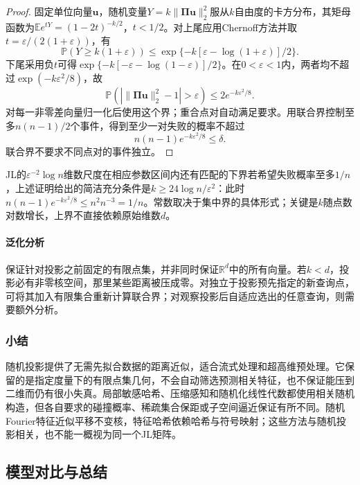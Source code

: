 \begin{proof}
固定单位向量$\bm{u}$，随机变量$Y=k\lVert\bm{\Pi}\bm{u}\rVert_2^2$服从$k$自由度的卡方分布，其矩母函数为$\mathbb{E}e^{tY}=(1-2t)^{-k/2}$，$t<1/2$。对上尾应用Chernoff方法并取$t=\varepsilon/(2(1+\varepsilon))$，有
\[
  \mathbb{P}(Y\geq k(1+\varepsilon))
  \leq\exp\{-k[\varepsilon-\log(1+\varepsilon)]/2\}.
\]
下尾采用负$t$可得$\exp\{-k[-\varepsilon-\log(1-\varepsilon)]/2\}$。在$0<\varepsilon<1$内，两者均不超过$\exp(-k\varepsilon^2/8)$，故
\[
  \mathbb{P}\left(
   \left|\lVert\bm{\Pi}\bm{u}\rVert_2^2-1\right|>\varepsilon
   \right)\leq2e^{-k\varepsilon^2/8}.
\]
对每一非零差向量归一化后使用这个界；重合点对自动满足要求。用联合界控制至多$n(n-1)/2$个事件，得到至少一对失败的概率不超过
\[
  n(n-1)e^{-k\varepsilon^2/8}\leq\delta.
\]
联合界不要求不同点对的事件独立。
\end{proof}

JL的$\varepsilon^{-2}\log n$维数尺度在相应参数区间内还有匹配的下界若希望失败概率至多$1/n$，上述证明给出的简洁充分条件是$k\geq24\log n/\varepsilon^2$：此时$n(n-1)e^{-k\varepsilon^2/8}\leq n^2n^{-3}=1/n$。常数取决于集中界的具体形式；关键是$k$随点数对数增长，上界不直接依赖原始维数$d$。

\paragraph{泛化分析}

保证针对投影之前固定的有限点集，并非同时保证$\mathbb{R}^{d}$中的所有向量。若$k<d$，投影必有非零核空间，那里某些距离被压成零。对独立于投影预先指定的新查询点，可将其加入有限集合重新计算联合界；对观察投影后自适应选出的任意查询，则需要额外分析。

\subsubsection{小结}
\label{sec:dim-rp-summary}

随机投影提供了无需先拟合数据的距离近似，适合流式处理和超高维预处理。它保留的是指定度量下的有限点集几何，不会自动筛选预测相关特征，也不保证能压到二维而仍有很小失真。局部敏感哈希、压缩感知和随机化线性代数都使用相关随机构造，但各自要求的碰撞概率、稀疏集合保距或子空间逼近保证有所不同。随机Fourier特征近似平移不变核，特征哈希依赖哈希与符号映射；这些方法与随机投影相关，也不能一概视为同一个JL矩阵。

\subsection{模型对比与总结}
\label{sec:dim-linear-comparison}

